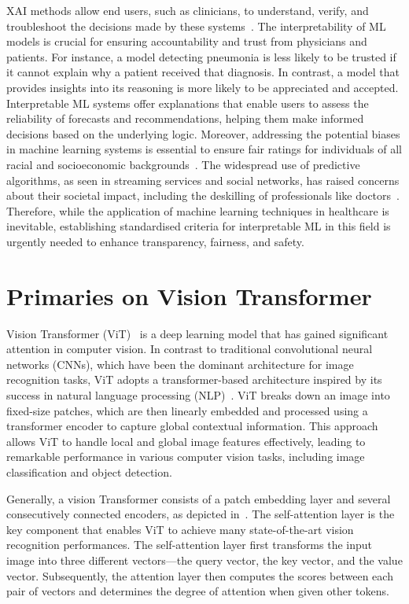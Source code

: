 \documentclass[dvipsnames]{article}
\renewcommand{\cite}[1]{\autocite{#1}}
\begin{document}
XAI methods allow end users, such as clinicians, to understand, verify, and troubleshoot the decisions made by these systems~\cite{8419428}. The interpretability of ML models is crucial for ensuring accountability and trust from physicians and patients. For instance, a model detecting pneumonia is less likely to be trusted if it cannot explain why a patient received that diagnosis. In contrast, a model that provides insights into its reasoning is more likely to be appreciated and accepted. Interpretable ML systems offer explanations that enable users to assess the reliability of forecasts and recommendations, helping them make informed decisions based on the underlying logic. Moreover, addressing the potential biases in machine learning systems is essential to ensure fair ratings for individuals of all racial and socioeconomic backgrounds~\cite{doi:10.1177/2053951715622512}. The widespread use of predictive algorithms, as seen in streaming services and social networks, has raised concerns about their societal impact, including the deskilling of professionals like doctors~\cite{arnold2021teasing}. Therefore, while the application of machine learning techniques in healthcare is inevitable, establishing standardised criteria for interpretable ML in this field is urgently needed to enhance transparency, fairness, and safety.




\section{Primaries on Vision Transformer}


Vision Transformer (ViT)~\cite{dosovitskiy2020image} is a deep learning model that has gained significant attention in computer vision.
In contrast to traditional convolutional neural networks (CNNs), which have been the dominant architecture for image recognition tasks, ViT adopts a transformer-based architecture inspired by its success in natural language processing (NLP)~\cite{vaswani2017attention}. ViT breaks down an image into fixed-size patches, which are then linearly embedded and processed using a transformer encoder to capture global contextual information. This approach allows ViT to handle local and global image features effectively, leading to remarkable performance in various computer vision tasks, including image classification and object detection.



Generally, a vision Transformer consists of a patch embedding layer and several consecutively connected encoders, as depicted in~.
The self-attention layer is the key component that enables ViT to achieve many state-of-the-art vision recognition performances.
The self-attention layer first transforms the input image into three different vectors---the query vector, the key vector, and the value vector.
Subsequently, the attention layer then computes the scores between each pair of vectors and determines the degree of attention when given other tokens.
\end{document}
